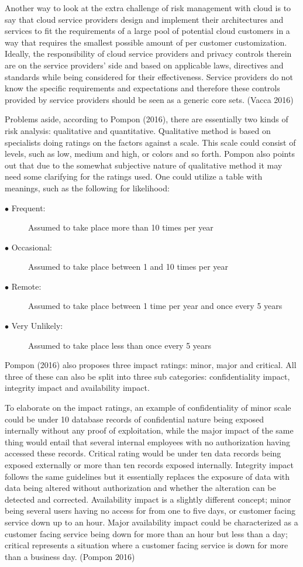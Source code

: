 \documentclass{article}
\begin{document}
Another way to look at the extra challenge of risk management with cloud is to say that cloud service providers design and implement their architectures and services to fit the requirements of a large pool of potential cloud customers in a way that requires the smallest possible amount of per customer customization. Ideally, the responsibility of cloud service providers and privacy controls therein are on the service providers' side and based on applicable laws, directives and standards while being considered for their effectiveness. Service providers do not know the specific requirements and expectations and therefore these controls provided by service providers should be seen as a generic core sets. (Vacca 2016)
\par
Problems aside, according to Pompon (2016), there are essentially two kinds of risk analysis: qualitative and quantitative. Qualitative method is based on specialists doing ratings on the factors against a scale. This scale could consist of levels, such as low, medium and high, or colors and so forth.
Pompon also points out that due to the somewhat subjective nature of qualitative method it may need some clarifying for the ratings used. One could utilize a table with meanings, such as the following for likelihood:
\begin{description}
	\item[$\bullet$ Frequent:] Assumed to take place more than 10 times per year
	\item[$\bullet$ Occasional:] Assumed to take place between 1 and 10 times per year
	\item[$\bullet$ Remote:] Assumed to take place between 1 time per year and once every 5 years
	\item[$\bullet$ Very Unlikely:] Assumed to take place less than once every 5 years
\end{description}
Pompon (2016) also proposes three impact ratings: minor, major and critical. All three of these can also be split into three sub categories: confidentiality impact, integrity impact and availability impact.
\par
To elaborate on the impact ratings, an example of confidentiality of minor scale could be under 10 database records of confidential nature being exposed internally without any proof of exploitation, while the major impact of the same thing would entail that several internal employees with no authorization having accessed these records. Critical rating would be under ten data records being exposed externally or more than ten records exposed internally. Integrity impact follows the same guidelines but it essentially replaces the exposure of data with data being altered without authorization and whether the alteration can be detected and corrected. Availability impact is a slightly different concept; minor being several users having no access for from one to five days, or customer facing service down up to an hour. Major availability impact could be characterized as a customer facing service being down for more than an hour but less than a day; critical represents a situation where a customer facing service is down for more than a business day. (Pompon 2016) 
\end{document}
